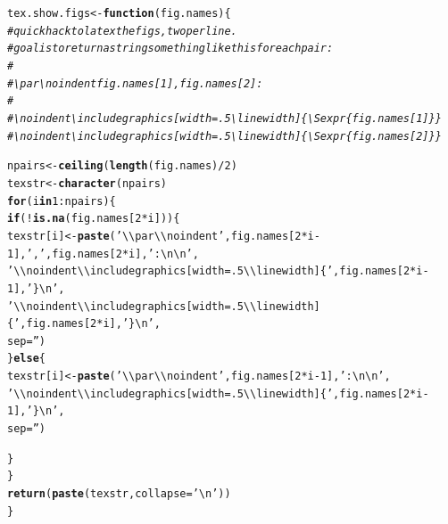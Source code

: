 \documentclass{article}\usepackage[]{graphicx}\usepackage[]{color}
\makeatletter
\newcommand{\hlnum}[1]{\textcolor[rgb]{0.686,0.059,0.569}{#1}}%
\newcommand{\hlstr}[1]{\textcolor[rgb]{0.192,0.494,0.8}{#1}}%
\newcommand{\hlcom}[1]{\textcolor[rgb]{0.678,0.584,0.686}{\textit{#1}}}%
\newcommand{\hlopt}[1]{\textcolor[rgb]{0,0,0}{#1}}%
\newcommand{\hlstd}[1]{\textcolor[rgb]{0.345,0.345,0.345}{#1}}%
\newcommand{\hlkwa}[1]{\textcolor[rgb]{0.161,0.373,0.58}{\textbf{#1}}}%
\newcommand{\hlkwb}[1]{\textcolor[rgb]{0.69,0.353,0.396}{#1}}%
\newcommand{\hlkwc}[1]{\textcolor[rgb]{0.333,0.667,0.333}{#1}}%
\newcommand{\hlkwd}[1]{\textcolor[rgb]{0.737,0.353,0.396}{\textbf{#1}}}%
\newenvironment{kframe}{%
 \def\at@end@of@kframe{}%
 \ifinner\ifhmode%
  \def\at@end@of@kframe{\end{minipage}}%
  \begin{minipage}{\columnwidth}%
 \fi\fi%
 \def\FrameCommand##1{\hskip\@totalleftmargin \hskip-\fboxsep
 \colorbox{shadecolor}{##1}\hskip-\fboxsep
     \hskip-\linewidth \hskip-\@totalleftmargin \hskip\columnwidth}%
 \MakeFramed {\advance\hsize-\width
   \@totalleftmargin\z@ \linewidth\hsize
   \@setminipage}}%
 {\par\unskip\endMakeFramed%
 \at@end@of@kframe}
\newenvironment{knitrout}{}{} %
\makeatother
\begin{document}
\begin{knitrout}\footnotesize
{}\color{fgcolor}\begin{kframe}
\begin{alltt}
\hlstd{tex.show.figs} \hlkwb{<-} \hlkwa{function}\hlstd{(}\hlkwc{fig.names}\hlstd{)\{}
  \hlcom{# quick hack to latex the figs, two per line.}
  \hlcom{# goal is to return a string something like this for each pair:}
  \hlcom{#}
  \hlcom{# \textbackslash{}par\textbackslash{}noindent fig.names[1], fig.names[2]:}
  \hlcom{#}
  \hlcom{# \textbackslash{}noindent\textbackslash{}includegraphics[width=.5\textbackslash{}linewidth]\{\textbackslash{}Sexpr\{fig.names[1]\}\}}
  \hlcom{# \textbackslash{}noindent\textbackslash{}includegraphics[width=.5\textbackslash{}linewidth]\{\textbackslash{}Sexpr\{fig.names[2]\}\}}

  \hlstd{npairs} \hlkwb{<-} \hlkwd{ceiling}\hlstd{(}\hlkwd{length}\hlstd{(fig.names)}\hlopt{/}\hlnum{2}\hlstd{)}
  \hlstd{texstr} \hlkwb{<-} \hlkwd{character}\hlstd{(npairs)}
  \hlkwa{for}\hlstd{(i} \hlkwa{in} \hlnum{1}\hlopt{:}\hlstd{npairs)\{}
    \hlkwa{if}\hlstd{(}\hlopt{!}\hlkwd{is.na}\hlstd{(fig.names[}\hlnum{2}\hlopt{*}\hlstd{i]))\{}
      \hlstd{texstr[i]} \hlkwb{<-} \hlkwd{paste}\hlstd{(}\hlstr{'\textbackslash{}\textbackslash{}par\textbackslash{}\textbackslash{}noindent '}\hlstd{, fig.names[}\hlnum{2}\hlopt{*}\hlstd{i}\hlopt{-}\hlnum{1}\hlstd{],} \hlstr{', '}\hlstd{, fig.names[}\hlnum{2}\hlopt{*}\hlstd{i],} \hlstr{':\textbackslash{}n\textbackslash{}n'}\hlstd{,}
                         \hlstr{'\textbackslash{}\textbackslash{}noindent\textbackslash{}\textbackslash{}includegraphics[width=.5\textbackslash{}\textbackslash{}linewidth]\{'}\hlstd{, fig.names[}\hlnum{2}\hlopt{*}\hlstd{i}\hlopt{-}\hlnum{1}\hlstd{],} \hlstr{'\}\textbackslash{}n'}\hlstd{,}
                         \hlstr{'\textbackslash{}\textbackslash{}noindent\textbackslash{}\textbackslash{}includegraphics[width=.5\textbackslash{}\textbackslash{}linewidth]\{'}\hlstd{, fig.names[}\hlnum{2}\hlopt{*}\hlstd{i],} \hlstr{'\}\textbackslash{}n'}\hlstd{,}
                         \hlkwc{sep}\hlstd{=}\hlstr{''}\hlstd{)}
    \hlstd{\}} \hlkwa{else} \hlstd{\{}
      \hlstd{texstr[i]} \hlkwb{<-} \hlkwd{paste}\hlstd{(}\hlstr{'\textbackslash{}\textbackslash{}par\textbackslash{}\textbackslash{}noindent '}\hlstd{, fig.names[}\hlnum{2}\hlopt{*}\hlstd{i}\hlopt{-}\hlnum{1}\hlstd{],} \hlstr{':\textbackslash{}n\textbackslash{}n'}\hlstd{,}
                         \hlstr{'\textbackslash{}\textbackslash{}noindent\textbackslash{}\textbackslash{}includegraphics[width=.5\textbackslash{}\textbackslash{}linewidth]\{'}\hlstd{, fig.names[}\hlnum{2}\hlopt{*}\hlstd{i}\hlopt{-}\hlnum{1}\hlstd{],} \hlstr{'\}\textbackslash{}n'}\hlstd{,}
                         \hlkwc{sep}\hlstd{=}\hlstr{''}\hlstd{)}

    \hlstd{\}}
  \hlstd{\}}
  \hlkwd{return}\hlstd{(}\hlkwd{paste}\hlstd{(texstr,}\hlkwc{collapse}\hlstd{=}\hlstr{'\textbackslash{}n'}\hlstd{))}
\hlstd{\}}
\end{alltt}
\end{kframe}
\end{knitrout}
\end{document}
